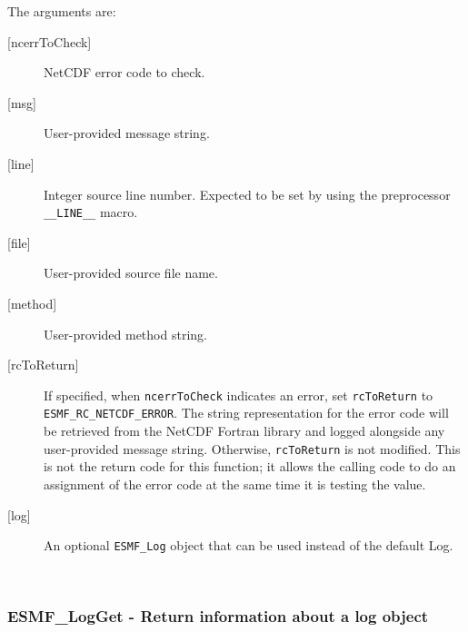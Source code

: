         The arguments are:
        \begin{description}
  
        \item [{[ncerrToCheck]}]
              NetCDF error code to check.
        \item [{[msg]}]
              User-provided message string.
        \item [{[line]}]
              Integer source line number.  Expected to be set by using the
              preprocessor {\tt \_\_LINE\_\_} macro.
        \item [{[file]}]
              User-provided source file name.
        \item [{[method]}]
              User-provided method string.
        \item [{[rcToReturn]}]
              If specified, when {\tt ncerrToCheck} indicates an error,
              set {\tt rcToReturn} to {\tt ESMF\_RC\_NETCDF\_ERROR}. The string
              representation for the error code will be retrieved from the NetCDF
              Fortran library and logged alongside any user-provided message
              string.
              Otherwise, {\tt rcToReturn} is not modified.
              This is not the return code for this function; it allows the
              calling code to do an assignment of the error code at the same time
              it is testing the value.
        \item [{[log]}]
              An optional {\tt ESMF\_Log} object that can be used instead
              of the default Log.
  
        \end{description}
   
 
\mbox{}\hrulefill\ 
 
\subsubsection [ESMF\_LogGet] {ESMF\_LogGet - Return information about a log object}


